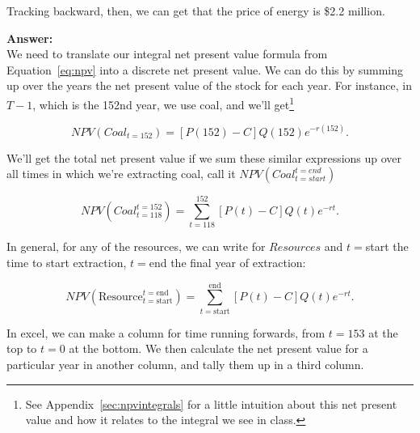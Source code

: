 \begin{enumerate}
\begin{Exercise}
\begin{sol}
        Tracking backward, then, we can get that the price of energy is \$2.2 million.
        
        
        
        
        

        
        
    \end{sol}
    
    
    \begin{sol}
    \textbf{Answer:}\\
    
    We need to translate our integral net present value formula from Equation~\ref{eq:npv} into a discrete net present value. We can do this by summing up over the years the net present value of the stock for each year. For instance, in $T-1$, which is the 152nd year, we use coal, and we'll get\footnote{See Appendix~\ref{sec:npvintegrals} for a little intuition about this net present value and how it relates to the integral we see in class.}
    
    \begin{equation}
        NPV(Coal_{t=152}) = [P(152) - C]Q(152)e^{-r(152)}.
        \label{eq:npvcoal}
    \end{equation}
    
    
    
    
    We'll get the total net present value if we sum these similar expressions up over all times in which we're extracting coal, call it $NPV(Coal_{t=start}^{t=end})$
    
    \begin{equation*}
        NPV(Coal_{t=118}^{t=152}) = \sum_{t=118}^{152} [P(t)-C]Q(t)e^{-rt}.
    \end{equation*}
    
    In general, for any of the resources, we can write for $Resources$ and $t=$start the time to start extraction, $t=$end the final year of extraction:
    
    \begin{equation*}
        NPV(\text{Resource}_{t=\text{start}}^{t=\text{end}}) = \sum_{t=\text{start}}^{\text{end}} [P(t)-C]Q(t)e^{-rt}.
        \label{eq:npvall}
    \end{equation*}
    
    In excel, we can make a column for time running forwards, from $t=153$ at the top to $t=0$ at the bottom. We then calculate the net present value for a particular year in another column, and tally them up in a third column.\\
    

\end{sol}
\end{Exercise}
\end{enumerate}
